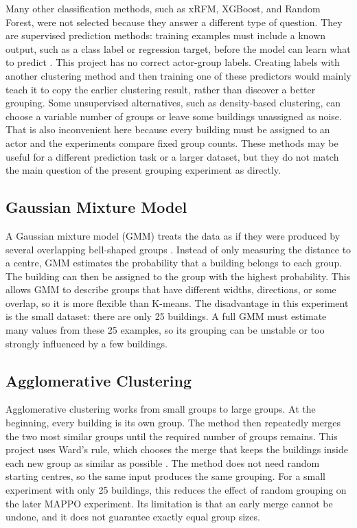 Many other classification methods, such as xRFM, XGBoost, and Random Forest,
were not selected because they answer a different type of question. They are
supervised prediction methods: training
examples must include a known output, such as a class label or regression
target, before the model can learn what to predict
\cite{beaglehole2025xrfm,chen2016xgboost,breiman2001randomforest}. This project
has no correct actor-group labels. Creating labels with another clustering
method and then training one of these predictors would mainly teach it to copy
the earlier clustering result, rather than discover a better grouping. Some
unsupervised alternatives, such as density-based clustering, can choose a
variable number of groups or leave some buildings unassigned as noise. That is
also inconvenient here because every building must be assigned to an actor and
the experiments compare fixed group counts. These methods may be useful for a
different prediction task or a larger dataset, but they do not match the main
question of the present grouping experiment as directly.


\subsection{Gaussian Mixture Model}

A Gaussian mixture model (GMM) treats the data as if they were produced by
several overlapping bell-shaped groups \cite{fraleyraftery2002}. Instead of
only measuring the distance to a centre, GMM estimates the probability that a
building belongs to each group. The building can then be assigned to the group
with the highest probability. This allows GMM to describe groups that have
different widths, directions, or some overlap, so it is more flexible than
K-means. The disadvantage in this experiment is the small dataset: there are
only 25 buildings. A full GMM must estimate many values from these 25 examples,
so its grouping can be unstable or too strongly influenced by a few buildings.


\subsection{Agglomerative Clustering}

Agglomerative clustering works from small groups to large groups. At the
beginning, every building is its own group. The method then repeatedly merges
the two most similar groups until the required number of groups remains. This
project uses Ward's rule, which chooses the merge that keeps the buildings
inside each new group as similar as possible \cite{ward1963}. The method does
not need random starting centres, so the same input produces the same grouping.
For a small experiment with only 25 buildings, this reduces the effect of random
grouping on the later MAPPO experiment. Its limitation is that an early merge
cannot be undone, and it does not guarantee exactly equal group sizes.


